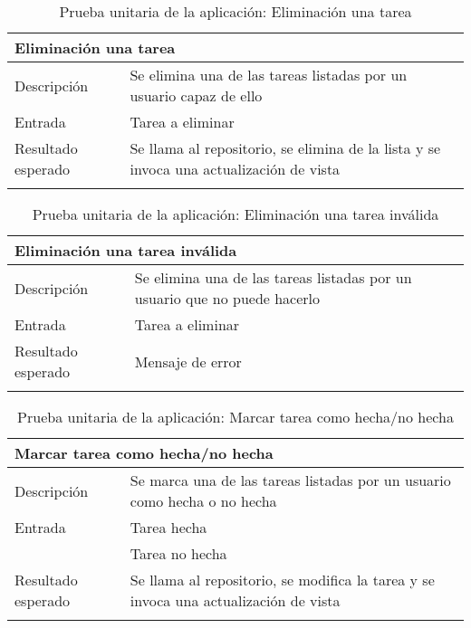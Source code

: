 \vspace{-20pt}
\begin{longtable}{|p{} p{}|}
    \hline
    \multicolumn{2}{|l|}{\textbf{Eliminación una tarea}} \\ \hline 
    Descripción                 & Se elimina una de las tareas listadas por un usuario capaz de ello \\ \hline
    Entrada                     & Tarea a eliminar \\ \hline
    Resultado esperado          & Se llama al repositorio, se elimina de la lista y se invoca una actualización de vista \\ \hline
    \caption{Prueba unitaria de la aplicación: Eliminación una tarea}
    \label{cp:u:app:eliminacion_tarea_vista}
\end{longtable}

\begin{longtable}{|p{} p{}|}
    \hline
    \multicolumn{2}{|l|}{\textbf{Eliminación una tarea inválida}} \\ \hline 
    Descripción                 & Se elimina una de las tareas listadas por un usuario que no puede hacerlo \\ \hline
    Entrada                     & Tarea a eliminar \\ \hline
    Resultado esperado          & Mensaje de error \\ \hline
    \caption{Prueba unitaria de la aplicación: Eliminación una tarea inválida}
    \label{cp:u:app:eliminacion_tarea_invalida}
\end{longtable}

\vspace{-15pt}
\begin{longtable}{|p{} p{}|}
    \hline
    \multicolumn{2}{|l|}{\textbf{Marcar tarea como hecha/no hecha}} \\ \hline 
    Descripción                 & Se marca una de las tareas listadas por un usuario como hecha o no hecha \\ \hline
    Entrada                     & Tarea hecha \\
                                & Tarea no hecha \\ \hline
    Resultado esperado          & Se llama al repositorio, se modifica la tarea y se invoca una actualización de vista \\ \hline
    \caption{Prueba unitaria de la aplicación: Marcar tarea como hecha/no hecha}
    \label{cp:u:app:marcar_tarea_hecha_no_hecha}
\end{longtable}

